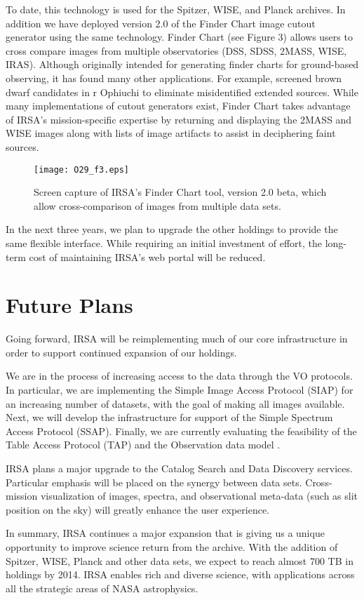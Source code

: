 \documentclass[11pt,twoside]{article}
\begin{document}
To date, this technology is used for the Spitzer, WISE, and Planck
archives. In addition we have deployed version 2.0 of the Finder Chart
image cutout generator using the same technology.  Finder Chart (see
Figure 3) allows users to cross compare images from multiple
observatories (DSS, SDSS, 2MASS, WISE, IRAS). Although originally
intended for generating finder charts for ground-based observing, it
has found many other applications. For example, \citet{mathews07}
screened brown dwarf candidates in r Ophiuchi to eliminate
misidentified extended sources. While many implementations of cutout
generators exist, Finder Chart takes advantage of IRSA’s
mission-specific expertise by returning and displaying the 2MASS and
WISE images along with lists of image artifacts to assist in
deciphering faint sources.

\begin{figure}[t]

\centering
\texttt{[image: O29\_f3.eps]}
\caption{Screen capture of IRSA's Finder Chart tool, version 2.0 beta,
which allow cross-comparison of images from multiple data sets.}

\end{figure}


In the next three years, we plan to upgrade the other holdings to
provide the same flexible interface. While requiring an initial
investment of effort, the long-term cost of maintaining IRSA’s web
portal will be reduced.

\section{Future Plans}

Going forward, IRSA will be reimplementing much of our core
infrastructure in order to support continued expansion of our
holdings.  

We are in the process of increasing access to the data through the VO
protocols.  In particular, we are implementing the Simple Image Access
Protocol (SIAP) for an increasing number of datasets, with the goal of making
all images available.  Next, we will develop the infrastructure for
support of the Simple Spectrum Access Protocol (SSAP). Finally, we are
currently evaluating the feasibility of the Table Access Protocol
(TAP) and the Observation data model \citet{louys11}.

IRSA plans a major upgrade to the Catalog Search and Data
Discovery services.  Particular emphasis will be placed on the synergy
between data sets.
Cross-mission visualization of images, spectra, and observational
meta-data (such as slit position on the sky) will greatly enhance the
user experience.

In summary, IRSA continues a major expansion that is giving us a
unique opportunity to improve science return from the archive.  With
the addition of Spitzer, WISE, Planck and other data sets, we expect
to reach almost 700 TB in holdings by 2014.  IRSA enables rich and
diverse science, with applications across all the strategic areas of
NASA astrophysics.  


\end{document}
